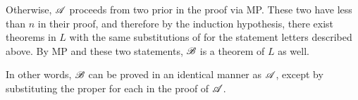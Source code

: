 \begin{enumerate}
    Otherwise, \(\mathscr{A}\) proceeds from two prior \wfs{} in the proof via MP. These two \wfs{} have less than \(n\) \wfs{} in their proof, and therefore by the induction hypothesis, there exist theorems in \(L\) with the same substitutions of \wfs{} for the statement letters described above. By MP and these two statements, \(\mathscr{B}\) is a theorem of \(L\) as well.

    \note{} In other words, \(\mathscr{B}\) can be proved in an identical manner as \(\mathscr{A}\), except by substituting the proper \wfs{} for each \wf{} in the proof of \(\mathscr{A}\).
\end{enumerate}
